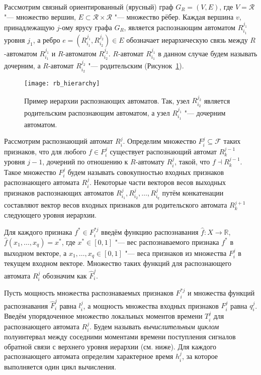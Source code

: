Рассмотрим связный ориентированный (ярусный) граф $G_R=(V,E)$, где $V=\mathcal R$ "--- множество вершин, $E\subset \mathcal R\times \mathcal R$ "--- множество рёбер. Каждая вершина $v$, принадлежащую $j$-ому ярусу графа $G_R$, является распознающим автоматом $R_{i_1}^{j_1}$ уровня $j_1$, а ребро $e=(R_{i_1}^{j_1},R_{i_2}^{j_2}){\in}E$ обозначает  иерархическую связь между $R$-автоматом $R_{i_1}^{j_1}$ и $R$-автоматом $R_{i_2}^{j_2}$. $R$-автомат $R_{i_1}^{j_1 }$ в данном случае будем называть дочерним, а $R$-автомат $R_{i_2}^{j_2}$ "--- родительским (Рисунок~\ref{fg:rb_hier}).

\begin{figure}[h]
	\centering
	\texttt{[image: rb\_hierarchy]}
	\caption{Пример иерархии распознающих автоматов. Так, узел $R_{i_2}^{j_2}$ является родительским распознающим автоматом, а узел $R_{i_1}^{j_1}$ "--- дочерним автоматом.}
	\label{fg:rb_hier}
\end{figure}

Рассмотрим распознающий автомат $R_i^j$. Определим множество $F_i^j{\subseteq}\mathcal F$ таких признаков, что для любого $f{\in}F_i^j$ существует распознающий автомат $R_k^{j-1}$ уровня $j-1$, дочерний по отношению к $R$-автомату $R_i^j$, такой, что $f{\dashv}R_k^{j-1}$. Такое множество $F_i^j$ будем называть совокупностью входных признаков распознающего автомата $R_i^j$. Некоторые части векторов весов выходных признаков распознающих автоматов $R_{i_1}^j,R_{i_2}^j,\dots,R_{i_q}^j$ путём конкатенации составляют вектор весов входных признаков для родительского автомата $R_k^{j+1}$ следующего уровня иерархии.

Для каждого признака $f^*{\in}F_i^{*j}$ введём функцию распознавания $\hat f:X\rightarrow\mathbb R$, $\hat{f}(x_1,\dots,x_q )=x^*$, где $x^*{\in}[0,1]$ "--- вес распознаваемого признака $f^*$ в выходном векторе, а $x_1,\dots,x_q{\in}[0,1]$ "--- веса признаков из множества $F_i^j$ в текущем входном векторе. Множество таких функций для распознающего автомата $R_i^j$ обозначим как $\hat{F}_i^j$.

Пусть мощность множества распознаваемых признаков $F_i^{*j}$ и множества функций распознавания $\hat{F}_i^j$ равна $l_i^j$, а мощность множества входных признаков $F_i^j$ равна $q_i^j$. Введём упорядоченное множество локальных моментов времени $T_i^j$ для распознающего автомата $R_i^j$. Будем называть \textit{вычислительным циклом} полуинтервал между соседними моментами времени поступления сигналов обратной связи с верхнего уровня иерархии (см. ниже). Для каждого распознающего автомата определим характерное время $h_i^j$, за которое выполняется один цикл вычисления. 

